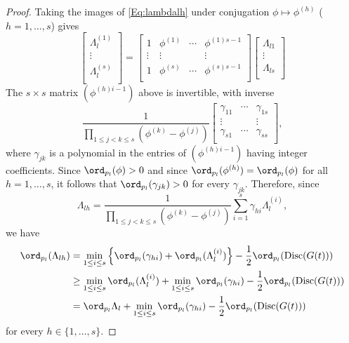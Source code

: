 {\begin{proof}
Taking the images of \eqref{Eq:lambdalh} under conjugation $\phi \mapsto \phi^{(h)}$ ($h = 1, \dots, s$) gives
\[\begin{bmatrix}
\Lambda_l^{(1)} \\
\vdots \\
\Lambda_l^{(s)}	\\
\end{bmatrix}
=
\begin{bmatrix}
1 		& \phi^{(1)} 	& \cdots 	& \phi^{(1)s-1}\\
\vdots 	& \vdots 		& 		& \vdots \\
1 		& \phi^{(s)} 	& \cdots  	& \phi^{(s)s-1}\\
\end{bmatrix}
\begin{bmatrix}
\Lambda_{l1}\\
\vdots \\
\Lambda_{ls}\\
\end{bmatrix}\]
The $s \times s$ matrix $(\phi^{(h)i-1})$ above is invertible, with inverse
\[\frac{1}{\displaystyle \prod_{1\leq j<k\leq s} (\phi^{(k)} - \phi^{(j)})}
\begin{bmatrix}
\gamma_{11} 	& \cdots 	& \gamma_{1s}\\
\vdots 		& 		& \vdots\\
\gamma_{s1} 	& \cdots 	& \gamma_{ss}\\
\end{bmatrix},\]
where $\gamma_{jk}$ is a polynomial in the entries of $(\phi^{(h)i-1})$ having integer coefficients. Since $\ord_{p_l}(\phi) > 0$ and since $\ord_{p_l}(\phi^{(h)}) = \ord_{p_l}(\phi)$ for all $h = 1, \dots, s$, it follows that $\ord_{p_l}(\gamma_{jk}) > 0 $ for every $\gamma_{jk}$. Therefore, since 
\[\Lambda_{lh} = \frac{1}{\displaystyle \prod_{1\leq j<k\leq s}(\phi^{(k)} - \phi^{(j)})}\sum_{i = 1}^s \gamma_{hi}\Lambda_l^{(i)},\]
we have 
\[\begin{split}
\ord_{p_l}(\Lambda_{lh}) 
	& = \min_{1 \leq i \leq s} \left\{\ord_{p_l}(\gamma_{hi}) + \ord_{p_l}(\Lambda_l^{(i)})\right\} -\frac{1}{2}\ord_{p_l}(\text{Disc}(G(t)))\\
	& \geq \min_{1 \leq i \leq s} \ord_{p_l}(\Lambda_l^{(i)}) +  \min_{1 \leq i \leq s} \ord_{p_l}(\gamma_{hi}) - \frac{1}{2}\ord_{p_l}(\text{Disc}(G(t)))\\
	& = \ord_{p_l}\Lambda_l + \min_{1 \leq i \leq s} \ord_{p_l}(\gamma_{hi}) - \frac{1}{2}\ord_{p_l}(\text{Disc}(G(t)))
\end{split}\]
for every $h \in \{1, \dots, s\}$. 
\end{proof}

}

